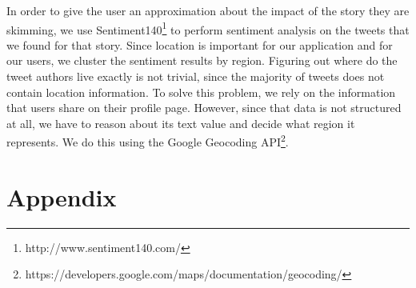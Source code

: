 \documentclass{acm_proc_10ptArticle-sp}
\begin{document}
In order to give the user an approximation about the impact of the story they are skimming, we use Sentiment140\footnote{http://www.sentiment140.com/} to perform sentiment analysis on the tweets that we found for that story. Since location is important for our application and for our users, we cluster the sentiment results by region. Figuring out where do the tweet authors live exactly is not trivial, since the majority of tweets does not contain location information. To solve this problem, we rely on the information that users share on their profile page. However, since that data is not structured at all, we have to reason about its text value and decide what region it represents. We do this using the Google Geocoding API\footnote{https://developers.google.com/maps/documentation/geocoding/}. 







\newpage

\onecolumn
\section{Appendix}





\end{document}
